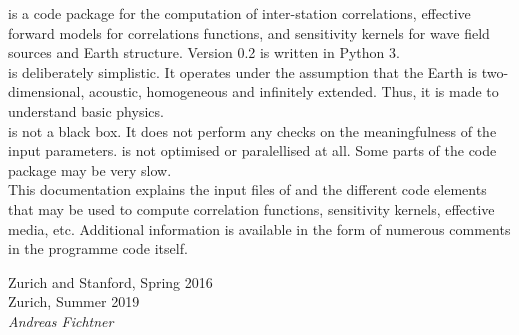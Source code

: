\foreword

\GI is a code package for the computation of inter-station correlations, effective forward models for correlations functions, and sensitivity kernels for wave field sources and Earth structure. Version 0.2 is written in Python 3.\\[5pt]
\GI is deliberately simplistic. It operates under the assumption that the Earth is two-dimensional, acoustic, homogeneous and infinitely extended. Thus, it is made to understand basic physics.\\[5pt]
\GI is not a black box. It does not perform any checks on the meaningfulness of the input parameters. \GI is not optimised or paralellised at all. Some parts of the code package may be very slow.\\[5pt]
This documentation explains the input files of \GI and the different code elements that may be used to compute correlation functions, sensitivity kernels, effective media, etc. Additional information is available in the form of numerous comments in the programme code itself.

\vspace{\baselineskip}
\begin{flushright}\noindent
Zurich and Stanford, Spring 2016\\
Zurich, Summer 2019\\[5pt]
\hfill {\it Andreas Fichtner}\\
\end{flushright}
